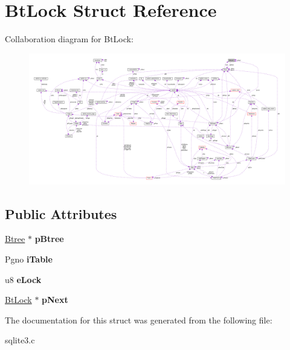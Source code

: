\hypertarget{structBtLock}{}\section{Bt\+Lock Struct Reference}
\label{structBtLock}


Collaboration diagram for Bt\+Lock\+:\nopagebreak
\begin{figure}[H]
\begin{center}
\leavevmode
\includegraphics[width=350pt]{structBtLock__coll__graph}
\end{center}
\end{figure}
\subsection*{Public Attributes}
\begin{DoxyCompactItemize}
\item 
\hyperlink{structBtree}{Btree} $\ast$ {\bfseries p\+Btree}\hypertarget{structBtLock_ab9125b8e79d480b75f3af21cb2ab55c7}{}\label{structBtLock_ab9125b8e79d480b75f3af21cb2ab55c7}

\item 
Pgno {\bfseries i\+Table}\hypertarget{structBtLock_a822efcf018d6c8eb343341cde5df980d}{}\label{structBtLock_a822efcf018d6c8eb343341cde5df980d}

\item 
u8 {\bfseries e\+Lock}\hypertarget{structBtLock_abe07b71018ee423e0d94b5cdba044b5c}{}\label{structBtLock_abe07b71018ee423e0d94b5cdba044b5c}

\item 
\hyperlink{structBtLock}{Bt\+Lock} $\ast$ {\bfseries p\+Next}\hypertarget{structBtLock_ad42de86209c7aab43604c52a549b7bca}{}\label{structBtLock_ad42de86209c7aab43604c52a549b7bca}

\end{DoxyCompactItemize}


The documentation for this struct was generated from the following file\+:\begin{DoxyCompactItemize}
\item 
sqlite3.\+c\end{DoxyCompactItemize}
